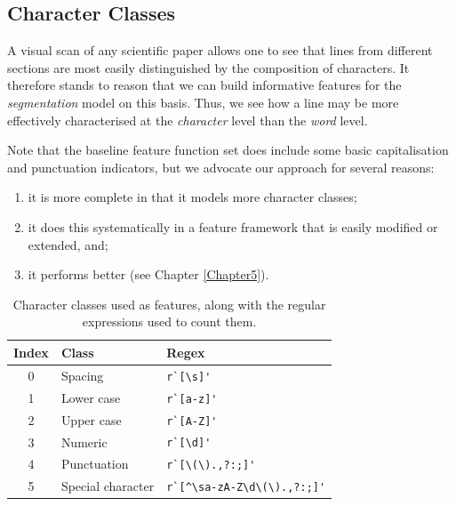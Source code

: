 \subsection{Character Classes}

A visual scan of any scientific paper allows one to see that lines from different sections are most easily distinguished by the composition of characters. It therefore stands to reason that we can build informative features for the \emph{segmentation} model on this basis. Thus, we see how a line may be more effectively characterised at the \emph{character} level than the \emph{word} level.

Note that the baseline feature function set does include some basic capitalisation and punctuation indicators, but we advocate our approach for several reasons:

\begin{enumerate}
\item it is more complete in that it models more character classes;
\item it does this systematically in a feature framework that is easily modified or extended, and;
\item it performs better (see Chapter \ref{Chapter5}).
\end{enumerate}

\begin{table}[h]
\begin{center}
\begin{tabular}{|c|l|l|}
\hline
Index & Class & Regex\\
\hline
0 & Spacing & \verb|r`[\s]'|\\
1 & Lower case & \verb|r`[a-z]'|\\
2 & Upper case & \verb|r`[A-Z]'|\\
3 & Numeric & \verb|r`[\d]'|\\
4 & Punctuation & \verb|r`[\(\).,?:;]'|\\
5 & Special character & \verb|r`[^\sa-zA-Z\d\(\).,?:;]'|\\
\hline
\end{tabular}
\caption[Character classes used as features, along with the regular expressions used to count them.]{Character classes used as features, along with the regular expressions used to count them.}
\label{table:characterclasses}
\end{center}
\end{table}

